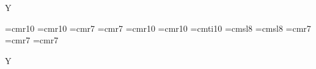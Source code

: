 
\if Y\abcmusix%

\else%




\fi


\vsize=10.5in
\hsize=7.7in
\voffset=-0.75in
\hoffset=-0.75in

\raggedbottom
\nopagenumbers



\font\Xfont=cmr10
\font\Tfont=cmr10
\font\Tafont=cmr7  %
\font\Tbfont=cmr7  %
\font\Tifont=cmr10 %
\font\Wfont=cmr10
\font\Sfont=cmti10
\font\Cfont=cmsl8
\font\Afont=cmsl8
\font\Nfont=cmr7
\font\Pfont=cmr7
\font\gfont=cmr7   %


\if Y\abcmusix%
\smallmusicsize
\nobarnumbers
\else%
\relax
\def\freqbarno{99}
\fi
\def\stdafterruleskip{2\Internote}
\parindent 0pt

\let\tune=\vbox




\def\header{%
\hbox to\hsize{\hfil\Tfont \Xstring.\ \Tstring\ %
\if Y\Strue{\Sfont(\Sstring)}\ \fi%
\hfil%
\if Y\Ctrue{\Cfont\Cstring}\ \fi%
\if Y\Atrue{\Afont(\Astring)}\fi%
}\nobreak%
\if Y\Ntrue{\centerline{\Nfont \Nstring}\nobreak}\fi%
\if Y\Tatrue{\centerline{\Tafont AKA \Tastring}\nobreak}\fi%
\if Y\Tbtrue{\Tbfont AKA \Tbstring}\fi%
\if Y\Ptrue{\line{\Pfont Play \Pstring\hfil}\nobreak}\fi%
}

\def\Tline#1{\medskip\line{\Tifont #1\hfil}}
\def\Wline#1{\smallskip\line{\Wfont #1\hfil}}
\def\Pline#1{\notes\uptext{\Pfont #1}\enotes\relax}


